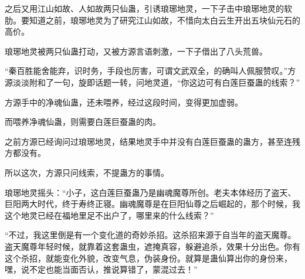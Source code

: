\begin{this_body}
之后又用江山如故、人如故两只仙蛊，引诱琅琊地灵，一下子击中琅琊地灵的软肋。要知道之前，琅琊地灵为了研究江山如故，不惜向太白云生开出五块仙元石的高价。

琅琊地灵被两只仙蛊打动，又被方源言语刺激，一下子借出了八头荒兽。

“秦百胜能舍能弃，识时务，手段也厉害，可谓文武双全，的确叫人佩服赞叹。”方源淡淡附和了一句，旋即话题一转，问地灵道，“你这边可有白莲巨蚕蛊的线索？”

方源手中的净魂仙蛊，还未喂养，经过这段时间，变得更加虚弱。

而喂养净魂仙蛊，则需要白莲巨蚕蛊的肉。

之前方源已经询问过琅琊地灵，结果地灵手中并没有白莲巨蚕蛊的蛊方，甚至连残方都没有。

所以这次，方源只问线索，不提蛊方的事情。

琅琊地灵摇头：“小子，这白莲巨蚕蛊乃是幽魂魔尊所创。老夫本体经历了盗天、巨阳两大时代，终于寿终正寝。幽魂魔尊是在巨阳仙尊之后崛起的，那个时候，我这个地灵已经在福地里足不出户了，哪里来的什么线索？”

“不过，我这里倒是有一个变化道的奇妙杀招。这杀招来源于自当年的盗天魔尊。盗天魔尊年轻时候，就靠着这套蛊虫，遮掩真容，躲避追杀，效果十分出色。你有这个杀招，就能变化外貌，改变气息，伪装身份。就算是蛊仙算出你的身份来，嘿，说不定也能当面否认，推说算错了，蒙混过去！”

\end{this_body}

